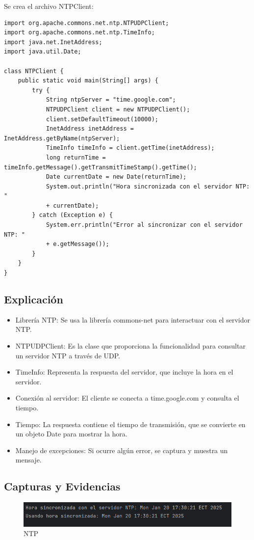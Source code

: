 \documentclass[a4paper,12pt]{report}
\begin{document}
Se crea el archivo NTPClient:
\begin{verbatim}
import org.apache.commons.net.ntp.NTPUDPClient;
import org.apache.commons.net.ntp.TimeInfo;
import java.net.InetAddress;
import java.util.Date;

class NTPClient {
    public static void main(String[] args) {
        try {
            String ntpServer = "time.google.com";
            NTPUDPClient client = new NTPUDPClient();
            client.setDefaultTimeout(10000); 
            InetAddress inetAddress = InetAddress.getByName(ntpServer);
            TimeInfo timeInfo = client.getTime(inetAddress);
            long returnTime = timeInfo.getMessage().getTransmitTimeStamp().getTime();
            Date currentDate = new Date(returnTime);
            System.out.println("Hora sincronizada con el servidor NTP: "
            + currentDate);
        } catch (Exception e) {
            System.err.println("Error al sincronizar con el servidor NTP: " 
            + e.getMessage());
        }
    }
}
\end{verbatim}
\subsection{Explicación}


\begin{itemize}
    \item Librería NTP: Se usa la librería commons-net para interactuar con el servidor NTP.
    \item NTPUDPClient: Es la clase que proporciona la funcionalidad para consultar un servidor NTP a través de UDP.
    \item TimeInfo: Representa la respuesta del servidor, que incluye la hora en el servidor.
    \item Conexión al servidor: El cliente se conecta a time.google.com y consulta el tiempo.
    \item Tiempo: La respuesta contiene el tiempo de transmisión, que se convierte en un objeto Date para mostrar la hora.
    \item Manejo de excepciones: Si ocurre algún error, se captura y muestra un mensaje.
\end{itemize}

\subsection{Capturas y Evidencias}
\begin{figure} [H]
    \centering
    \includegraphics[width=1\linewidth]{images/ntp.png}
    \caption{NTP}
    \label{fig:enter-label}
\end{figure}
\end{document}
